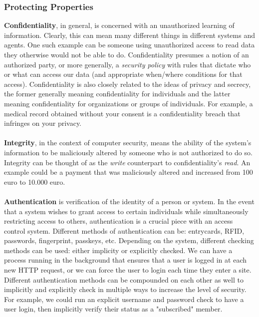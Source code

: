 \documentclass[11pt]{article}
\begin{document}
\subsubsection{Protecting Properties}
\textbf{Confidentiality}, in general, is concerned with an unauthorized learning of information.
Clearly, this can mean many different things in different systems and agents.
One such example can be someone using unauthorized access to read data they otherwise would not be able to do.
Confidentiality presumes a notion of an authorized party, or more generally, a \textit{security policy} with rules that dictate who or what can access our data (and appropriate when/where conditions for that access).
Confidentiality is also closely related to the ideas of privacy and secrecy, the former generally meaning confidentiality for individuals and the latter meaning confidentiality for organizations or groups of individuals.
For example, a medical record obtained without your consent is a confidentiality breach that infringes on your privacy.
\\ \\
\textbf{Integrity}, in the context of computer security, means the ability of the system's information to be maliciously altered by someone who is not authorized to do so.
Integrity can be thought of as the \textit{write} counterpart to confidentiality's \textit{read}.
An example could be a payment that was maliciously altered and increased from 100 euro to 10.000 euro.
\\ \\
\textbf{Authentication} is verification of the identity of a person or system.
In the event that a system wishes to grant access to certain individuals while simultaneously restricting access to others, authentication is a crucial piece with an access control system.
Different methods of authentication can be: entrycards, RFID, passwords, fingerprint, passkeys, etc.
Depending on the system, different checking methods can be used: either implicity or explicitly checked.
We can have a process running in the background that ensures that a user is logged in at each new HTTP request, or we can force the user to login each time they enter a site.
Different authentication methods can be compounded on each other as well to implicitly and explicitly check in multiple ways to increase the level of security.
For example, we could run an explicit username and password check to have a user login, then implicitly verify their status as a "subscribed" member.
\\ \\
\end{document}
